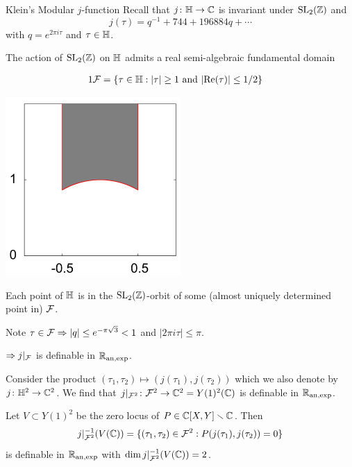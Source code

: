 \documentclass{beamer}
\begin{document}
\begin{frame}{Klein's Modular $j$-function}
   Recall that $j\colon {\mathbb{H}}\rightarrow{\mathbb{C}}$ is invariant under
    $\mathrm{SL}_2({\mathbb{Z}})$ and
    $$j(\tau)=q^{-1}+744+196884q+\cdots$$
    with $q = e^{2\pi i \tau}$ and $\tau\in{\mathbb{H}}$.

  The action of $\mathrm{SL}_2({\mathbb{Z}})$ on ${\mathbb{H}}$ admits a real semi-algebraic
  fundamental domain
  
  \begin{minipage}{0.5\linewidth}
  \begin{alignat*}1
    \cF = \{ \tau\in \IH: |\tau|\ge 1 \text{ and }
    &|\mathrm{Re}(\tau)|\le 1/2\}
  \end{alignat*}
  \end{minipage} \hfill \begin{minipage}{0.35\textwidth}
    \includegraphics[width=0.5\textwidth]{fd.png}
  \end{minipage}

  Each point of ${\mathbb{H}}$ is in the $\mathrm{SL}_2({\mathbb{Z}})$-orbit of some
  (almost uniquely determined point in)
  ${\mathcal F}$.  
  
  Note $\tau\in {\mathcal F} \Rightarrow |q| \le e^{-\pi \sqrt{3}}<1$ and $|2\pi
  i \tau| \le \pi$. 

  $\Rightarrow j|_{{\mathcal F}}$ is definable in ${{\mathbb{R}}_{\mathrm{an,exp}}}$. 
\end{frame}

\begin{frame}
  Consider the product $(\tau_1,\tau_2)\mapsto
  (j(\tau_1),j(\tau_2))$ which we also denote by
  $j\colon{\mathbb{H}}^2\rightarrow{\mathbb{C}}^2$. We find that
  $j|_{{\mathcal F}^2}\colon {\mathcal F}^2\rightarrow{\mathbb{C}}^2=Y(1)^2({\mathbb{C}})$ is definable in ${{\mathbb{R}}_{\mathrm{an,exp}}}$.

  Let $V \subset Y(1)^2$ be the zero locus of $P\in {\mathbb{C}}[X,Y]\smallsetminus{\mathbb{C}}$. 
  Then 
  \begin{equation*}
    j|_{{\mathcal F}^2}^{-1}(V({\mathbb{C}})) = \{(\tau_1,\tau_2)\in{\mathcal F}^2 :
    P(j(\tau_1),j(\tau_2))=0\} 
  \end{equation*}
  is definable in ${{\mathbb{R}}_{\mathrm{an,exp}}}$ with $\dim j|_{{\mathcal F}^2}^{-1}(V({\mathbb{C}})) =
  2$.  
\end{frame}
\end{document}
